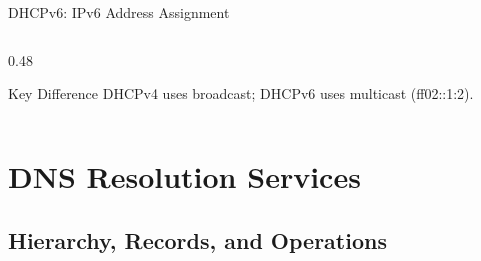 \documentclass[aspectratio=169]{beamer}  %
\begin{document}
\begin{frame}{DHCPv6: IPv6 Address Assignment}
\begin{columns}[T]
\begin{column}{0.48\textwidth}
            \vspace{0.2em}
            \begin{alertblock}{Key Difference}
                \small
                DHCPv4 uses broadcast; DHCPv6 uses multicast (ff02::1:2).
            \end{alertblock}
        \end{column}
    \end{columns}
\end{frame}

\section{DNS Resolution Services}
\subsection{Hierarchy, Records, and Operations}

\end{document}
